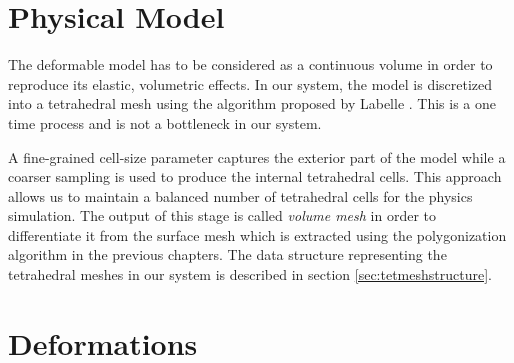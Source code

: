 \section{Physical Model}
\label{sec:physicalmodel}
The deformable model has to be considered as a continuous volume in order to reproduce its elastic, 
volumetric effects. In our system, the \blob model is discretized into a tetrahedral mesh using the 
algorithm proposed by Labelle \etal \cite{Labelle2007}. This is a one time process 
and is not a bottleneck in our system. 


A fine-grained cell-size parameter captures the exterior part of the model while a coarser sampling is 
used to produce the internal tetrahedral cells. This approach allows us to maintain a balanced number 
of tetrahedral cells for the physics simulation. The output of this stage is called \textit{volume mesh} in 
order to differentiate it from the surface mesh which is extracted using the polygonization algorithm in 
the previous chapters. The data structure representing the tetrahedral meshes in our system is described in section 
\ref{sec:tetmeshstructure}.



\section{Deformations}





 




















